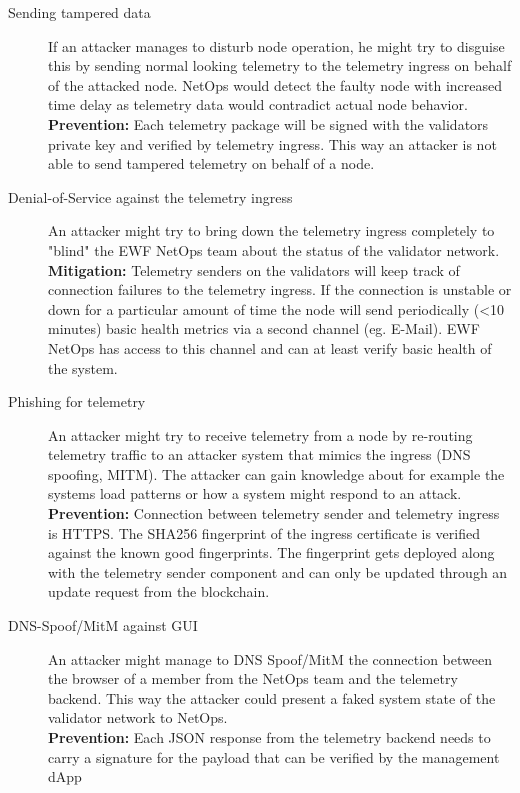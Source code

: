 \begin{description}
    \item[Sending tampered data] 
        If an attacker manages to disturb node operation, he might try to disguise this by sending normal looking telemetry to the telemetry ingress on behalf of the attacked node. NetOps would detect the faulty node with increased time delay as telemetry data would contradict actual node behavior. \\
        \textbf{Prevention:} Each telemetry package will be signed with the validators private key and verified by telemetry ingress. This way an attacker is not able to send tampered telemetry on behalf of a node.
    
    \item[Denial-of-Service against the telemetry ingress] 
        An attacker might try to bring down the telemetry ingress completely to "blind" the EWF NetOps team about the status of the validator network. \\
        \textbf{Mitigation:} Telemetry senders on the validators will keep track of connection failures to the telemetry ingress. If the connection is unstable or down for a particular amount of time the node will send periodically (<10 minutes) basic health metrics via a second channel (eg. E-Mail).
        EWF NetOps has access to this channel and can at least verify basic health of the system.

    \item[Phishing for telemetry] 
        An attacker might try to receive telemetry from a node by re-routing telemetry traffic to an attacker system that mimics the ingress (DNS spoofing, MITM). The attacker can gain knowledge about for example the systems load patterns or how a system might respond to an attack. \\
        \textbf{Prevention:} Connection between telemetry sender and telemetry ingress is HTTPS. The SHA256 fingerprint of the ingress certificate is verified against the known good fingerprints.
        The fingerprint gets deployed along with the telemetry sender component and can only be updated through an update request from the blockchain.
        
    \item[DNS-Spoof/MitM against GUI] 
        An attacker might manage to DNS Spoof/MitM the connection between the browser of a member from the NetOps team and the telemetry backend. This way the attacker could present a faked system state of the validator network to NetOps. \\
        \textbf{Prevention:} Each JSON response from the telemetry backend needs to carry a signature for the payload that can be verified by the management dApp


\end{description}
